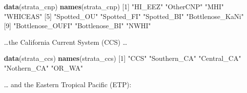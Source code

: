 \documentclass[
]{book}
\newenvironment{Shaded}{\begin{snugshade}}{\end{snugshade}}
\newcommand{\DecValTok}[1]{\textcolor[rgb]{0.00,0.00,0.81}{#1}}
\newcommand{\KeywordTok}[1]{\textcolor[rgb]{0.13,0.29,0.53}{\textbf{#1}}}
\newcommand{\NormalTok}[1]{#1}
\newcommand{\StringTok}[1]{\textcolor[rgb]{0.31,0.60,0.02}{#1}}
\begin{document}
\begin{Shaded}
\begin{Highlighting}[]
\KeywordTok{data}\NormalTok{(strata_cnp) }
\KeywordTok{names}\NormalTok{(strata_cnp)}
\NormalTok{ [}\DecValTok{1}\NormalTok{] }\StringTok{"HI_EEZ"}          \StringTok{"OtherCNP"}        \StringTok{"MHI"}             \StringTok{"WHICEAS"}        
\NormalTok{ [}\DecValTok{5}\NormalTok{] }\StringTok{"Spotted_OU"}      \StringTok{"Spotted_FI"}      \StringTok{"Spotted_BI"}      \StringTok{"Bottlenose_KaNi"}
\NormalTok{ [}\DecValTok{9}\NormalTok{] }\StringTok{"Bottlenose_OUFI"} \StringTok{"Bottlenose_BI"}   \StringTok{"NWHI"}           
\end{Highlighting}
\end{Shaded}

\ldots the California Current System (CCS) \ldots{}

\begin{Shaded}
\begin{Highlighting}[]
\KeywordTok{data}\NormalTok{(strata_ccs) }
\KeywordTok{names}\NormalTok{(strata_ccs)}
\NormalTok{[}\DecValTok{1}\NormalTok{] }\StringTok{"CCS"}         \StringTok{"Southern_CA"} \StringTok{"Central_CA"}  \StringTok{"Nothern_CA"}  \StringTok{"OR_WA"}      
\end{Highlighting}
\end{Shaded}

\ldots{} and the Eastern Tropical Pacific (ETP):
\end{document}
